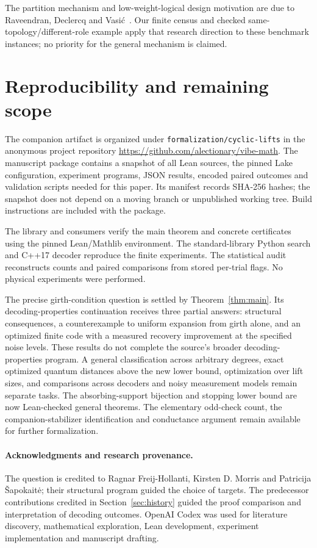 \documentclass[11pt]{article}
\theoremstyle{definition}
\theoremstyle{remark}
\begin{document}
The partition mechanism and low-weight-logical design motivation are due
to Raveendran, Declercq and Vasi\'c~\cite{RDV2025}. Our finite census and
checked same-topology/different-role example apply that research direction
to these benchmark instances; no priority for the general mechanism is
claimed.

\section{Reproducibility and remaining scope}\label{sec:artifact}

The companion artifact is organized under
\texttt{formalization/cyclic-lifts} in the anonymous project repository
\url{https://github.com/alectionary/vibe-math}. The manuscript package
contains a snapshot of all Lean sources, the pinned Lake configuration,
experiment programs, JSON results, encoded paired outcomes and validation
scripts needed for this paper. Its manifest records SHA-256 hashes;
the snapshot does not depend on a moving branch or unpublished working
tree. Build instructions are included with the package.

The library and consumers verify the main theorem and concrete
certificates using the pinned Lean/Mathlib environment. The standard-library
Python search and C++17 decoder reproduce the finite experiments.
The statistical audit reconstructs counts and paired comparisons from
stored per-trial flags. No physical experiments were performed.

The precise girth-condition question is settled by
Theorem~\ref{thm:main}. Its decoding-properties continuation receives
three partial answers: structural consequences, a counterexample
to uniform expansion from girth alone, and an optimized finite code with
a measured recovery improvement at the specified noise levels. These results
do not complete the source's broader decoding-properties program. A general classification across
arbitrary degrees, exact optimized quantum distances above the new lower
bound, optimization over
lift sizes, and comparisons across decoders and noisy measurement models
remain separate tasks. The absorbing-support bijection and stopping lower bound are now
Lean-checked general theorems. The elementary odd-check count, the
companion-stabilizer identification and conductance argument remain
available for further formalization.

\paragraph{Acknowledgments and research provenance.}
The question is credited to Ragnar Freij-Hollanti, Kirsten D. Morris and
Patricija \v Sapokait\.{e}; their structural program guided the choice of
targets. The predecessor contributions credited in Section~\ref{sec:history}
guided the proof comparison and interpretation of decoding outcomes.
OpenAI Codex was used for literature discovery, mathematical exploration,
Lean development, experiment implementation and manuscript drafting.
\end{document}
